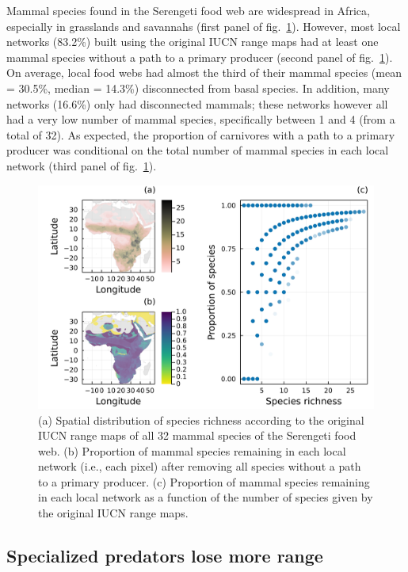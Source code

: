 \documentclass[10pt,oneside]{article}
\makeatletter
\def\maxwidth{\ifdim\Gin@nat@width>\linewidth\linewidth
\else\Gin@nat@width\fi}
\let\Oldincludegraphics\includegraphics
\renewcommand{\includegraphics}[1]{\Oldincludegraphics[width=\maxwidth]{#1}}
\makeatother
\begin{document}
Mammal species found in the Serengeti food web are widespread in Africa,
especially in grasslands and savannahs (first panel of
fig.~\ref{fig:richness}). However, most local networks (83.2\%) built
using the original IUCN range maps had at least one mammal species
without a path to a primary producer (second panel of
fig.~\ref{fig:richness}). On average, local food webs had almost the
third of their mammal species (mean = 30.5\%, median = 14.3\%)
disconnected from basal species. In addition, many networks (16.6\%)
only had disconnected mammals; these networks however all had a very low
number of mammal species, specifically between 1 and 4 (from a total of
32). As expected, the proportion of carnivores with a path to a primary
producer was conditional on the total number of mammal species in each
local network (third panel of fig.~\ref{fig:richness}).

\begin{figure}
\hypertarget{fig:richness}{%
\centering
\includegraphics{figures/richness_prop_removed.png}
\caption{(a) Spatial distribution of species richness according to the
original IUCN range maps of all 32 mammal species of the Serengeti food
web. (b) Proportion of mammal species remaining in each local network
(i.e., each pixel) after removing all species without a path to a
primary producer. (c) Proportion of mammal species remaining in each
local network as a function of the number of species given by the
original IUCN range maps.}\label{fig:richness}
}
\end{figure}

\hypertarget{specialized-predators-lose-more-range}{%
\subsection{Specialized predators lose more
range}\label{specialized-predators-lose-more-range}}
\end{document}
